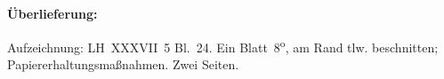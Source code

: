 %  
%
%
%
%   
%
%
%
%
%
%
%
%
\frenchspacing
%
\begin{ledgroupsized}[r]{120mm}
\footnotesize
\pstart
\noindent\textbf{Überlieferung:}
\pend
\end{ledgroupsized}
%
\begin{ledgroupsized}[r]{114mm}
\footnotesize
\pstart \parindent -6mm
%
Aufzeichnung:
LH~XXXVII~5 Bl.~24. 
Ein Blatt~8\textsuperscript{o},
am Rand tlw. beschnitten;
Papiererhaltungsmaßnahmen.
Zwei Seiten.
\pend
\end{ledgroupsized}
%
%
\vspace{5mm}
